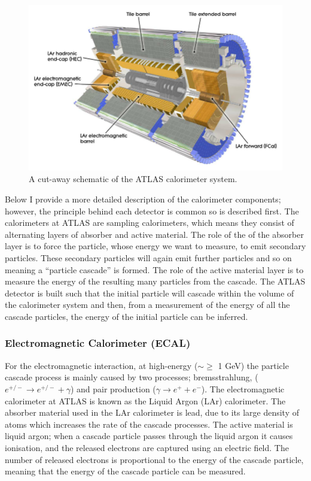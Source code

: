 \begin{figure}[!ht]
  \begin{center}
    \includegraphics[width=1\linewidth, angle=0]{figs/Detector/Calo_schem.png}
  \end{center}
  \caption{
    A cut-away schematic of the ATLAS calorimeter system.}
  \label{fig:det-calo_schem}
\end{figure}

Below I provide a more detailed description of the calorimeter components;
however, the principle behind each detector is common so is described first.
The calorimeters at ATLAS are sampling calorimeters, which means they consist of alternating layers of absorber and active material.
The role of the of the absorber layer is to force the particle, whose energy we want to measure, to emit secondary particles.
These secondary particles will again emit further particles and so on meaning a ``particle cascade'' is formed.
The role of the active material layer is to measure the energy of the resulting many particles from the cascade.
The ATLAS detector is built such that the initial particle will cascade within the volume of the calorimeter system
and then, from a measurement of the energy of all the cascade particles,
the energy of the initial particle can be inferred. \\

\subsubsection{Electromagnetic Calorimeter (ECAL)}

For the electromagnetic interaction, at high-energy ($\sim \geq$ 1 GeV) the particle cascade process is mainly caused by two processes;
bremsstrahlung, ($e^{+/-} \to e^{+/-} + \gamma$) and pair production ($\gamma \to e^{+} + e^{-}$).
The electromagnetic calorimeter at ATLAS is known as the Liquid Argon (LAr) calorimeter.
The absorber material used in the LAr calorimeter is lead, due to its large density of atoms which increases the rate of the cascade processes.
The active material is liquid argon;
when a cascade particle passes through the liquid argon it causes ionisation,
and the released electrons are captured using an electric field.
The number of released electrons is proportional to the energy of the cascade particle,
meaning that the energy of the cascade particle can be measured. \\

